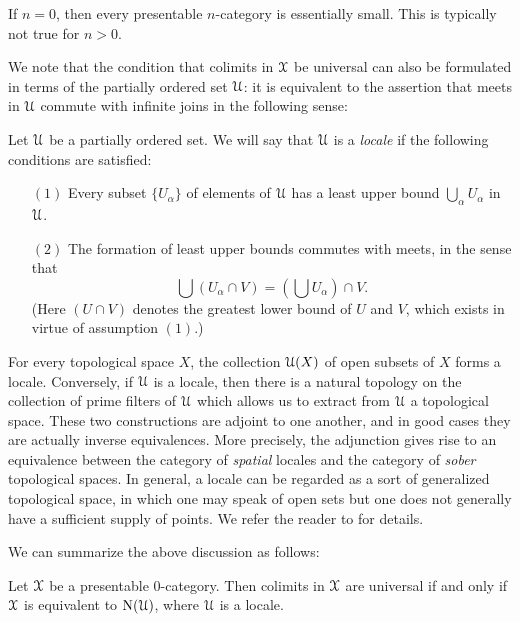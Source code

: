 \begin{remark}
If $n=0$, then every presentable $n$-category is essentially small. This is typically not true for $n > 0$.
\end{remark}

We note that the condition that colimits in $\operatorname{\mathcal{X}}$ be universal can also be formulated in terms of the partially ordered set $\operatorname{\mathcal{U}}$: it is equivalent to the assertion that meets in $\operatorname{\mathcal{U}}$ commute with infinite joins in the following sense:

\begin{definition}\label{deflocale}
Let $\operatorname{\mathcal{U}}$ be a partially ordered set. We will say that $\operatorname{\mathcal{U}}$ is a {\em locale} if the following conditions are satisfied:
\begin{itemize}
\item[$(1)$] Every subset $\{ U_{\alpha} \}$ of elements of $\operatorname{\mathcal{U}}$ has a least upper bound
$\bigcup_{\alpha} U_{\alpha}$ in $\operatorname{\mathcal{U}}$.

\item[$(2)$] The formation of least upper bounds commutes with meets, in the sense that
$$ \bigcup (U_{\alpha} \cap V) = ( \bigcup U_{\alpha} ) \cap V.$$ (Here $(U \cap V)$ denotes the greatest lower bound of $U$ and $V$, which exists in virtue of assumption $(1)$.)
\end{itemize}
\end{definition}

\begin{example}
For every topological space $X$, the collection $\operatorname{\mathcal{U}}(X)$ of open subsets of $X$ forms a locale. 
Conversely, if $\operatorname{\mathcal{U}}$ is a locale, then there is a natural topology on the collection of prime filters of $\operatorname{\mathcal{U}}$ which allows us to extract from $\operatorname{\mathcal{U}}$ a topological space. These two constructions are adjoint to one another, and in good cases they are actually inverse equivalences. More precisely, the adjunction gives rise to an equivalence between the category of {\em spatial} locales and the category of {\em sober} topological spaces\label{sober}. In general, a locale can be regarded as a sort of generalized topological space, in which one may speak of open sets but one does not generally have a sufficient supply of points. We refer the reader to \cite{johnstone} for details.
\end{example}

We can summarize the above discussion as follows:

\begin{proposition}\label{colim0univ}
Let $\operatorname{\mathcal{X}}$ be a presentable $0$-category. Then colimits in $\operatorname{\mathcal{X}}$ are universal if and only if $\operatorname{\mathcal{X}}$ is equivalent to $\operatorname{N}(\operatorname{\mathcal{U}})$, where $\operatorname{\mathcal{U}}$ is a locale.
\end{proposition}

